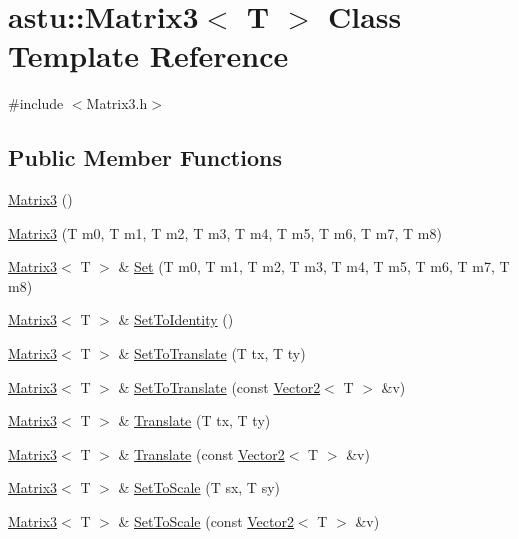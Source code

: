 \hypertarget{classastu_1_1Matrix3}{}\section{astu\+:\+:Matrix3$<$ T $>$ Class Template Reference}
\label{classastu_1_1Matrix3}


{\ttfamily \#include $<$Matrix3.\+h$>$}

\subsection*{Public Member Functions}
\begin{DoxyCompactItemize}
\item 
\hyperlink{classastu_1_1Matrix3_a0f2aa5af3f3ddfce06f307cfd939916b}{Matrix3} ()
\item 
\hyperlink{classastu_1_1Matrix3_a787ffd4295914696ee0b65b2b18f1b22}{Matrix3} (T m0, T m1, T m2, T m3, T m4, T m5, T m6, T m7, T m8)
\item 
\hyperlink{classastu_1_1Matrix3}{Matrix3}$<$ T $>$ \& \hyperlink{classastu_1_1Matrix3_af0933df691bce16e5be30853cb0dd3a5}{Set} (T m0, T m1, T m2, T m3, T m4, T m5, T m6, T m7, T m8)
\item 
\hyperlink{classastu_1_1Matrix3}{Matrix3}$<$ T $>$ \& \hyperlink{classastu_1_1Matrix3_a69c25bd7e2e01152b8e4cfc6193927dc}{Set\+To\+Identity} ()
\item 
\hyperlink{classastu_1_1Matrix3}{Matrix3}$<$ T $>$ \& \hyperlink{classastu_1_1Matrix3_a670c75846f8edc570d19186226e8f0a6}{Set\+To\+Translate} (T tx, T ty)
\item 
\hyperlink{classastu_1_1Matrix3}{Matrix3}$<$ T $>$ \& \hyperlink{classastu_1_1Matrix3_a3f29a9be6a1e77e81fc12bfb2bcd595c}{Set\+To\+Translate} (const \hyperlink{classastu_1_1Vector2}{Vector2}$<$ T $>$ \&v)
\item 
\hyperlink{classastu_1_1Matrix3}{Matrix3}$<$ T $>$ \& \hyperlink{classastu_1_1Matrix3_a9b06117981102b5fbf4b0b8fc61e697c}{Translate} (T tx, T ty)
\item 
\hyperlink{classastu_1_1Matrix3}{Matrix3}$<$ T $>$ \& \hyperlink{classastu_1_1Matrix3_a75cee163cb06cdc5ef63dbac70e54250}{Translate} (const \hyperlink{classastu_1_1Vector2}{Vector2}$<$ T $>$ \&v)
\item 
\hyperlink{classastu_1_1Matrix3}{Matrix3}$<$ T $>$ \& \hyperlink{classastu_1_1Matrix3_a042ee30172de0de71590161d4439073e}{Set\+To\+Scale} (T sx, T sy)
\item 
\hyperlink{classastu_1_1Matrix3}{Matrix3}$<$ T $>$ \& \hyperlink{classastu_1_1Matrix3_aab4690e7e0896d86726b982095b6a603}{Set\+To\+Scale} (const \hyperlink{classastu_1_1Vector2}{Vector2}$<$ T $>$ \&v)

\end{DoxyCompactItemize}
